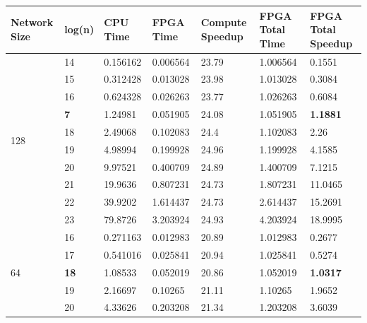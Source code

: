 \begin{table}
  \begin{tabularx}{\textwidth}{X|X|X|X|X|X|X}
    \hline
    Network Size        & log(n)      & CPU Time & FPGA Time & Compute Speedup & FPGA Total Time & FPGA Total Speedup \\
    \hline \hline
\multirow{10}{*}{128}   & 14          & 0.156162 & 0.006564  & 23.79           & 1.006564        & 0.1551             \\
                        & 15          & 0.312428 & 0.013028  & 23.98           & 1.013028        & 0.3084             \\
                        & 16          & 0.624328 & 0.026263  & 23.77           & 1.026263        & 0.6084             \\
                        & \textbf{7}  & 1.24981  & 0.051905  & 24.08           & 1.051905        & \textbf{1.1881}    \\
                        & 18          & 2.49068  & 0.102083  & 24.4            & 1.102083        & 2.26               \\
                        & 19          & 4.98994  & 0.199928  & 24.96           & 1.199928        & 4.1585             \\
                        & 20          & 9.97521  & 0.400709  & 24.89           & 1.400709        & 7.1215             \\
                        & 21          & 19.9636  & 0.807231  & 24.73           & 1.807231        & 11.0465            \\
                        & 22          & 39.9202  & 1.614437  & 24.73           & 2.614437        & 15.2691            \\
                        & 23          & 79.8726  & 3.203924  & 24.93           & 4.203924        & 18.9995            \\
    \hline
    \multirow{8}{*}{64} & 16          & 0.271163 & 0.012983  & 20.89           & 1.012983        & 0.2677             \\
                        & 17          & 0.541016 & 0.025841  & 20.94           & 1.025841        & 0.5274             \\
                        & \textbf{18} & 1.08533  & 0.052019  & 20.86           & 1.052019        & \textbf{1.0317}    \\
                        & 19          & 2.16697  & 0.10265   & 21.11           & 1.10265         & 1.9652             \\
                        & 20          & 4.33626  & 0.203208  & 21.34           & 1.203208        & 3.6039             \\

\end{tabularx}
\end{table}
